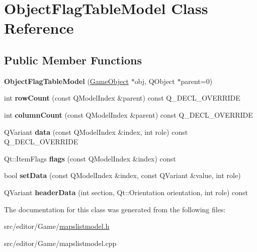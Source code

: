 \hypertarget{class_object_flag_table_model}{\section{\-Object\-Flag\-Table\-Model \-Class \-Reference}
\label{class_object_flag_table_model}
}
\subsection*{\-Public \-Member \-Functions}
\begin{DoxyCompactItemize}
\item 
\hypertarget{class_object_flag_table_model_a0262c5ecc3313c3d803ce24ec6378080}{{\bfseries \-Object\-Flag\-Table\-Model} (\hyperlink{class_game_object}{\-Game\-Object} $\ast$obj, \-Q\-Object $\ast$parent=0)}\label{class_object_flag_table_model_a0262c5ecc3313c3d803ce24ec6378080}

\item 
\hypertarget{class_object_flag_table_model_a2c62cafdcddc9a64dac28baabbc3a233}{int {\bfseries row\-Count} (const \-Q\-Model\-Index \&parent) const \-Q\-\_\-\-D\-E\-C\-L\-\_\-\-O\-V\-E\-R\-R\-I\-D\-E}\label{class_object_flag_table_model_a2c62cafdcddc9a64dac28baabbc3a233}

\item 
\hypertarget{class_object_flag_table_model_a1ee21132633db3b8f5b14bdd223c9b43}{int {\bfseries column\-Count} (const \-Q\-Model\-Index \&parent) const \-Q\-\_\-\-D\-E\-C\-L\-\_\-\-O\-V\-E\-R\-R\-I\-D\-E}\label{class_object_flag_table_model_a1ee21132633db3b8f5b14bdd223c9b43}

\item 
\hypertarget{class_object_flag_table_model_a2eee998c6159d124e9bdf3334f21660a}{\-Q\-Variant {\bfseries data} (const \-Q\-Model\-Index \&index, int role) const \-Q\-\_\-\-D\-E\-C\-L\-\_\-\-O\-V\-E\-R\-R\-I\-D\-E}\label{class_object_flag_table_model_a2eee998c6159d124e9bdf3334f21660a}

\item 
\hypertarget{class_object_flag_table_model_a20a47ee2abd063c1fdcb86faf0dc45e5}{\-Qt\-::\-Item\-Flags {\bfseries flags} (const \-Q\-Model\-Index \&index) const }\label{class_object_flag_table_model_a20a47ee2abd063c1fdcb86faf0dc45e5}

\item 
\hypertarget{class_object_flag_table_model_a60e32db4479e6f6601d417bfa379c6be}{bool {\bfseries set\-Data} (const \-Q\-Model\-Index \&index, const \-Q\-Variant \&value, int role)}\label{class_object_flag_table_model_a60e32db4479e6f6601d417bfa379c6be}

\item 
\hypertarget{class_object_flag_table_model_a5e70255c0576392997be23d66580ba46}{\-Q\-Variant {\bfseries header\-Data} (int section, \-Qt\-::\-Orientation orientation, int role) const }\label{class_object_flag_table_model_a5e70255c0576392997be23d66580ba46}

\end{DoxyCompactItemize}


\-The documentation for this class was generated from the following files\-:\begin{DoxyCompactItemize}
\item 
src/editor/\-Game/\hyperlink{mapslistmodel_8h}{mapslistmodel.\-h}\item 
src/editor/\-Game/mapslistmodel.\-cpp\end{DoxyCompactItemize}
